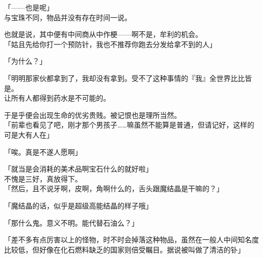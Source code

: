 「——也是呢」\\

与宝珠不同，物品并没有存在时间一说。

也就是说，其中便有中间商从中作梗——啊不是，牟利的机会。\\

「姑且先给你打一个预防针，我也不推荐你跑去分发给拿不到的人」

「为什么？」

「明明那家伙都拿到了，我却没有拿到。受不了这种事情的『我』全世界比比皆是。\\

让所有人都得到药水是不可能的。

于是乎便会出现生命的优劣贵贱。被记恨也是理所当然。\\

「前辈也看见了吧，刚才那个男孩子……嘛虽然不能算是普通，但请记好，这样的可是大有人在」

「唉。真是不遂人愿啊」

「就当是会消耗的美术品啊宝石什么的就好啦」\\

不愧是三好，真放得下。\\

「然后，且不说牙啊，皮啊，角啊什么的，舌头跟魔结晶是干嘛的？」

「魔结晶的话，似乎是超级高能结晶的样子哦」

「那什么鬼。意义不明。能代替石油么？」

「差不多有点厉害以上的怪物，时不时会掉落这种物品，虽然在一般人中间知名度比较低，但好像在化石燃料缺乏的国家则倍受瞩目。据说被叫做了清洁的钋」

